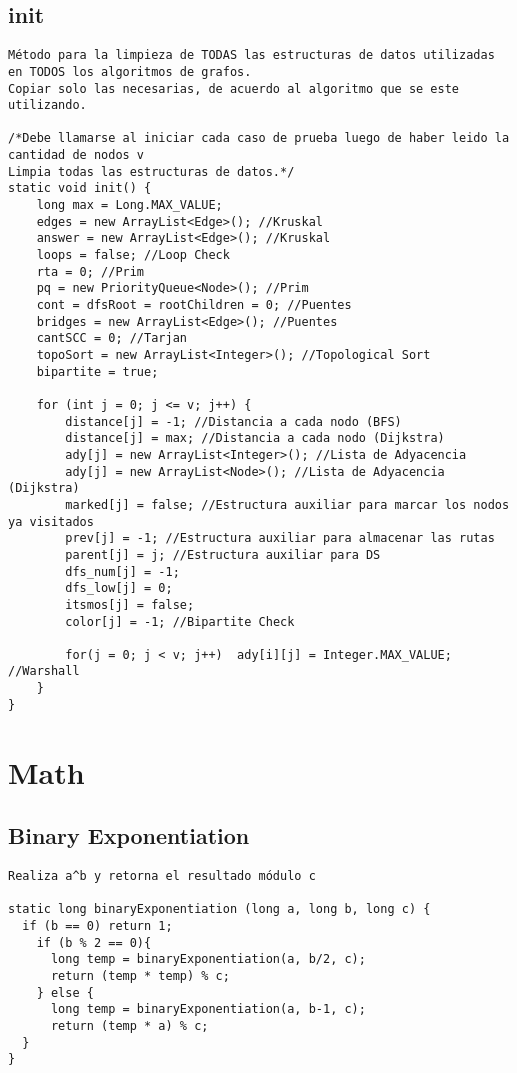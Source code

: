 \documentclass[10pt,letterpaper,twocolumn,twosided]{article}
\begin{document}
\subsection{init}
\begin{lstlisting}
Método para la limpieza de TODAS las estructuras de datos utilizadas en TODOS los algoritmos de grafos.
Copiar solo las necesarias, de acuerdo al algoritmo que se este utilizando.

/*Debe llamarse al iniciar cada caso de prueba luego de haber leido la cantidad de nodos v
Limpia todas las estructuras de datos.*/
static void init() {
    long max = Long.MAX_VALUE;
    edges = new ArrayList<Edge>(); //Kruskal
    answer = new ArrayList<Edge>(); //Kruskal
    loops = false; //Loop Check
    rta = 0; //Prim
    pq = new PriorityQueue<Node>(); //Prim
    cont = dfsRoot = rootChildren = 0; //Puentes
    bridges = new ArrayList<Edge>(); //Puentes
    cantSCC = 0; //Tarjan
    topoSort = new ArrayList<Integer>(); //Topological Sort
    bipartite = true;

    for (int j = 0; j <= v; j++) {
        distance[j] = -1; //Distancia a cada nodo (BFS)
        distance[j] = max; //Distancia a cada nodo (Dijkstra)
        ady[j] = new ArrayList<Integer>(); //Lista de Adyacencia
        ady[j] = new ArrayList<Node>(); //Lista de Adyacencia (Dijkstra)
        marked[j] = false; //Estructura auxiliar para marcar los nodos ya visitados
        prev[j] = -1; //Estructura auxiliar para almacenar las rutas
        parent[j] = j; //Estructura auxiliar para DS
        dfs_num[j] = -1;
        dfs_low[j] = 0;
        itsmos[j] = false;
        color[j] = -1; //Bipartite Check

        for(j = 0; j < v; j++)  ady[i][j] = Integer.MAX_VALUE; //Warshall
    }
}\end{lstlisting}

\section{Math}

\subsection{Binary Exponentiation}
\begin{lstlisting}
Realiza a^b y retorna el resultado módulo c

static long binaryExponentiation (long a, long b, long c) {
  if (b == 0) return 1;
	if (b % 2 == 0){
	  long temp = binaryExponentiation(a, b/2, c);
	  return (temp * temp) % c;
	} else {
	  long temp = binaryExponentiation(a, b-1, c);
	  return (temp * a) % c;
  }
}
\end{lstlisting}
\end{document}
